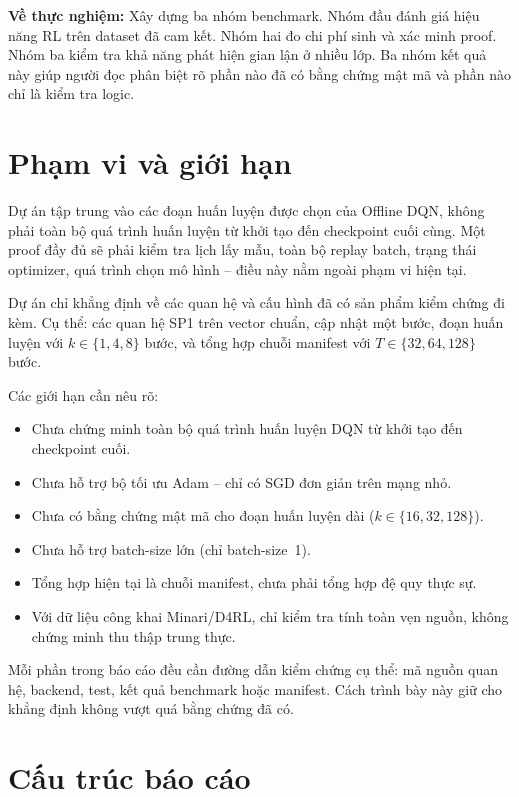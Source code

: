 \documentclass[12pt,a4paper,oneside]{report}
\begin{document}
\textbf{Về thực nghiệm:} Xây dựng ba nhóm benchmark. Nhóm đầu đánh giá hiệu năng RL trên dataset đã cam kết. Nhóm hai đo chi phí sinh và xác minh proof. Nhóm ba kiểm tra khả năng phát hiện gian lận ở nhiều lớp. Ba nhóm kết quả này giúp người đọc phân biệt rõ phần nào đã có bằng chứng mật mã và phần nào chỉ là kiểm tra logic.

\section{Phạm vi và giới hạn}

Dự án tập trung vào các đoạn huấn luyện được chọn của Offline DQN, không phải toàn bộ quá trình huấn luyện từ khởi tạo đến checkpoint cuối cùng. Một proof đầy đủ sẽ phải kiểm tra lịch lấy mẫu, toàn bộ replay batch, trạng thái optimizer, quá trình chọn mô hình -- điều này nằm ngoài phạm vi hiện tại.

\begin{notebox}
Dự án chỉ khẳng định về các quan hệ và cấu hình đã có sản phẩm kiểm chứng đi kèm. Cụ thể: các quan hệ SP1 trên vector chuẩn, cập nhật một bước, đoạn huấn luyện với \(k \in \{1,4,8\}\) bước, và tổng hợp chuỗi manifest với \(T \in \{32,64,128\}\) bước.
\end{notebox}

Các giới hạn cần nêu rõ:
\begin{itemize}[leftmargin=1.5em]
  \item Chưa chứng minh toàn bộ quá trình huấn luyện DQN từ khởi tạo đến checkpoint cuối.
  \item Chưa hỗ trợ bộ tối ưu Adam -- chỉ có SGD đơn giản trên mạng nhỏ.
  \item Chưa có bằng chứng mật mã cho đoạn huấn luyện dài (\(k \in \{16, 32, 128\}\)).
  \item Chưa hỗ trợ batch-size lớn (chỉ batch-size~1).
  \item Tổng hợp hiện tại là chuỗi manifest, chưa phải tổng hợp đệ quy thực sự.
  \item Với dữ liệu công khai Minari/D4RL, chỉ kiểm tra tính toàn vẹn nguồn, không chứng minh thu thập trung thực.
\end{itemize}

Mỗi phần trong báo cáo đều cần đường dẫn kiểm chứng cụ thể: mã nguồn quan hệ, backend, test, kết quả benchmark hoặc manifest. Cách trình bày này giữ cho khẳng định không vượt quá bằng chứng đã có.

\section{Cấu trúc báo cáo}
\end{document}
